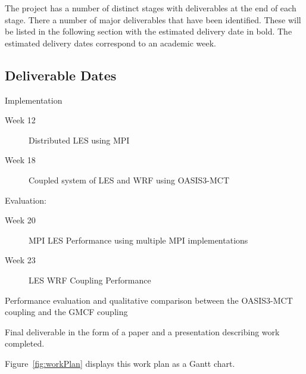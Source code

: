The project has a number of distinct stages with deliverables at the end of each
stage. There a number of major deliverables that have been identified. These
will be listed in the following section with the estimated delivery date in
bold. The estimated delivery dates correspond to an academic week.

\subsection{Deliverable Dates}

\begin{description}
    \item
    \item[Week 18] Implementation
    \begin{description}
        \item[Week 12] Distributed LES using MPI
        \item[Week 18] Coupled system of LES and WRF using OASIS3-MCT
    \end{description}
    \item[Week 27] Evaluation:
    \begin{description}
        \item[Week 20] MPI LES Performance using multiple MPI implementations
        \item[Week 23] LES WRF Coupling Performance
    \end{description}
    \item[Week 27] Performance evaluation and qualitative comparison between
    the OASIS3-MCT coupling and the GMCF coupling
    \item[Week 31] Final deliverable in the form of a paper and a presentation
    describing work completed.
\end{description}

Figure~\ref{fig:workPlan} displays this work plan as a Gantt chart.

